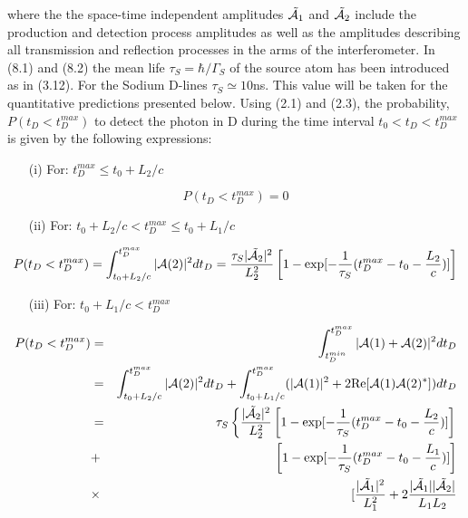 \documentclass [12pt]{article}
\begin{document}
{     where the the space-time independent amplitudes $\tilde{{\cal A}_1}$ and $\tilde{{\cal A}_2}$ include the
     production and detection process amplitudes as well as the amplitudes describing all transmission
     and reflection processes in the arms of the interferometer. In (8.1) and (8.2) the mean life
     $\tau_S = \hbar/\Gamma_S$ of the source atom has been introduced as in (3.12). For the Sodium
      D-lines $\tau_S \simeq 10$ns. This value will be taken for the quantitative predictions presented
     below.  Using (2.1) and (2.3), the probability, $P(t_D<t_D^{max})$ to detect the photon in D 
     during the time interval
      $t_0 < t_D < t_D^{max}$ is given by the following expressions:
       \begin{itemize}
    \item[(i)] For: $ t_D^{max} \le t_0 +L_2/c$
       \end{itemize}
     \begin{equation}
    P(t_D < t_D^{max}) = 0
     \end{equation}
     \begin{itemize}
    \item[(ii)] For: $t_0 +L_2/c < t_D^{max} \le t_0 +L_1/c$
       \end{itemize}
   \begin{equation}
   P(t_D < t_D^{max}) = \int_{t_0 +L_2/c}^{t_D^{max}} | {\cal A}(2)|^2 d t_D = \frac{\tau_S |\tilde{{\cal A}_2}|^2}
    {L_2^2}\left[1 - \exp[-\frac{1}{\tau_S}(t_D^{max}-t_0-\frac{L_2}{c})]\right]
    \end{equation}
      \begin{itemize}
    \item[(iii)] For: $t_0 +L_1/c < t_D^{max}$
     \end{itemize} 
 \begin{eqnarray}
   P(t_D < t_D^{max}) & = &   \int_{t_D^{min}}^{t_D^{max}} | {\cal A}(1)+{\cal A}(2)|^2 
   d t_D 
   \nonumber \\
  & = &  \int_{t_0 +L_2/c}^{t_D^{max}} | {\cal A}(2)|^2 d t_D +
     \int_{t_0 +L_1/c}^{t_D^{max}}(|{\cal A}(1)|^2 +2{\rm Re}[{\cal A}(1) {\cal A}(2)^{\ast}]) d t_D
  \nonumber \\
   & = & \tau_S \left\{ \frac{|\tilde{{\cal A}_2}|^2}{L_2^2}
 \left[1 - \exp[-\frac{1}{\tau_S}(t_D^{max}-t_0-\frac{L_2}{c})]\right] \right.
 \nonumber \\
  & + & \left[1 - \exp[-\frac{1}{\tau_S}(t_D^{max}-t_0-\frac{L_1}{c})]\right] \nonumber \\
   &\times & [ \frac{|\tilde{{\cal A}_1}|^2}{L_1^2} + 2 \frac{|\tilde{{\cal A}_1}||\tilde{{\cal A}_2}|}{L_1 L_2}

\end{eqnarray}}
\end{document}
